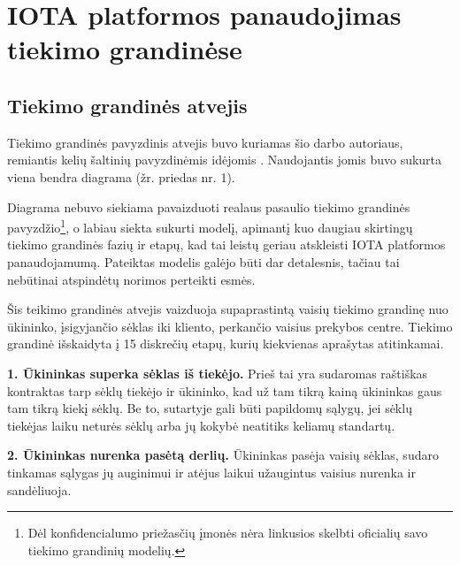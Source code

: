 
\section{IOTA platformos panaudojimas tiekimo grandinėse}




\subsection{Tiekimo grandinės atvejis}

Tiekimo grandinės pavyzdinis atvejis buvo kuriamas šio darbo autoriaus, remiantis kelių šaltinių pavyzdinėmis idėjomis \cite{christopher2016logistics, webber2009building, patrick2017continuous, justin2016customer}. Naudojantis jomis buvo sukurta viena bendra diagrama (žr. priedas nr. 1). 

Diagrama nebuvo siekiama pavaizduoti realaus pasaulio tiekimo grandinės pavyzdžio\footnote{Dėl konfidencialumo priežasčių įmonės nėra linkusios skelbti oficialių savo tiekimo grandinių modelių.}, o labiau siekta sukurti modelį, apimantį kuo daugiau skirtingų tiekimo grandinės fazių ir etapų, kad tai leistų geriau atskleisti IOTA platformos panaudojamumą. Pateiktas modelis galėjo būti dar detalesnis, tačiau tai nebūtinai atspindėtų norimos perteikti esmės.

Šis teikimo grandinės atvejis vaizduoja supaprastintą vaisių tiekimo grandinę nuo ūkininko, įsigyjančio sėklas iki kliento, perkančio vaisius prekybos centre. Tiekimo grandinė išskaidyta į 15 diskrečių etapų, kurių kiekvienas aprašytas atitinkamai.

\medskip \noindent \textbf{1. Ūkininkas superka sėklas iš tiekėjo.} Prieš tai yra sudaromas raštiškas kontraktas tarp sėklų tiekėjo ir ūkininko, kad už tam tikrą kainą ūkininkas gaus tam tikrą kiekį sėklų. Be to, sutartyje gali būti papildomų sąlygų, jei sėklų tiekėjas laiku neturės sėklų arba jų kokybė neatitiks keliamų standartų.

\medskip \noindent \textbf{2. Ūkininkas nurenka pasėtą derlių.} Ūkininkas pasėja vaisių sėklas, sudaro tinkamas sąlygas jų auginimui ir atėjus laikui užaugintus vaisius nurenka ir sandėliuoja. 

